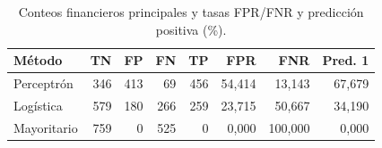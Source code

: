 \begin{table}[htbp]
\centering\small
\caption{Conteos financieros principales y tasas FPR/FNR y predicción positiva (\%).}\label{tab:tf-confusiones}
\begin{tabular}{lrrrrrrr}\toprule
Método & TN & FP & FN & TP & FPR & FNR & Pred. 1 \\ \midrule
Perceptrón & 346 & 413 & 69 & 456 & 54,414 & 13,143 & 67,679 \\
Logística & 579 & 180 & 266 & 259 & 23,715 & 50,667 & 34,190 \\
Mayoritario & 759 & 0 & 525 & 0 & 0,000 & 100,000 & 0,000 \\
\bottomrule\end{tabular}
\end{table}
